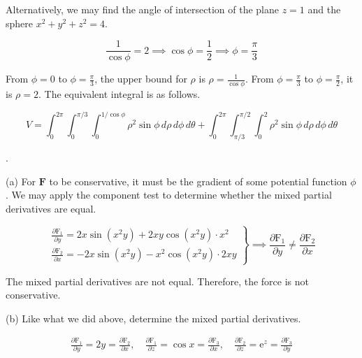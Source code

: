 \documentclass{article}
\begin{document}
\hfill

\noindent Alternatively, we may find the angle of intersection of the plane $z=1$ and the sphere $x^2+y^2+z^2=4$.

\[\frac1{\cos\phi}=2\implies\cos\phi=\frac12\implies\phi=\frac\pi3\]

\hfill

\noindent From $\phi=0$ to $\displaystyle\phi=\frac\pi3$, the upper bound for $\rho$ is $\displaystyle\rho=\frac1{\cos\phi}$. From $\displaystyle\phi=\frac\pi3$ to $\displaystyle\phi=\frac\pi2$, it is $\rho=2$. The equivalent integral is as follows.

\[\boxed{V=\int_0^{2\pi}\int_0^{\pi/3}\int_0^{1/\cos\phi}\rho^2\sin\phi\,d\rho\,d\phi\,d\theta+\int_0^{2\pi}\int_{\pi/3}^{\pi/2}\int_0^2\rho^2\sin\phi\,d\rho\,d\phi\,d\theta}\]

\hfill

.

\hfill

\noindent (a) For $\mathbf{F}$ to be conservative, it must be the gradient of some potential function $\phi$. We may apply the component test to determine whether the mixed partial derivatives are equal.

\hfill

\[
\left.
\begin{array}{l}
\displaystyle\frac{\partial\mathrm{F}_1}{\partial y}=2x\sin\left(x^2y\right)+2xy\cos\left(x^2y\right)\cdot x^2\\[1em]
\displaystyle\frac{\partial\mathrm{F}_2}{\partial x}=-2x\sin\left(x^2y\right)-x^2\cos\left(x^2y\right)\cdot 2xy
\end{array}\right\}\implies\displaystyle\frac{\partial\mathrm{F}_1}{\partial y}\neq\displaystyle\frac{\partial\mathrm{F}_2}{\partial x}
\]

\hfill

\noindent The mixed partial derivatives are not equal. Therefore, the force is not conservative.

\hfill

\noindent (b) Like what we did above, determine the mixed partial derivatives.

\[
\begin{array}{c}
\displaystyle\frac{\partial\mathrm{F}_1}{\partial y}=2y=\frac{\partial\mathrm{F}_2}{\partial x},\quad\frac{\partial\mathrm{F}_1}{\partial z}=\cos x=\frac{\partial\mathrm{F}_3}{\partial x},\quad\frac{\partial\mathrm{F}_2}{\partial z}=\mathrm{e}^z=\frac{\partial\mathrm{F}_3}{\partial y}
\end{array}
\]
\end{document}
